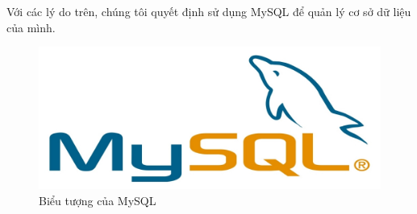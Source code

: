 \documentclass[12pt]{report}
\begin{document}
						Với các lý do trên, chúng tôi quyết định sử dụng MySQL để quản lý cơ sở dữ liệu của mình.
							\begin{figure}[H]
								\centering
								\includegraphics[scale=0.5]{images/mysql.jpg}
								\caption[Biểu tượng của MySQL]{Biểu tượng của MySQL \protect\footnotemark{}}
								\label{fig:mysql}
							\end{figure}
\end{document}
